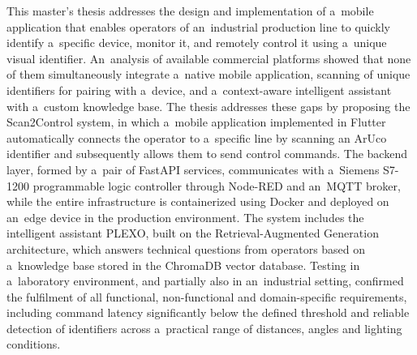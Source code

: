 This master's thesis addresses the design and implementation of a~mobile
application that enables operators of an~industrial production line to
quickly identify a~specific device, monitor it, and remotely control it
using a~unique visual identifier. An~analysis of available commercial
platforms showed that none of them simultaneously integrate a~native
mobile application, scanning of unique identifiers for pairing with
a~device, and a~context-aware intelligent assistant with a~custom
knowledge base. The thesis addresses these gaps by proposing the
Scan2Control system, in which a~mobile application implemented in Flutter
automatically connects the operator to a~specific line by scanning an
ArUco identifier and subsequently allows them to send control commands.
The backend layer, formed by a~pair of FastAPI
services, communicates with a~Siemens S7-1200 programmable logic
controller through Node-RED and an~MQTT broker, while the entire
infrastructure is containerized using Docker and deployed on an~edge
device in the production environment. The system includes the
intelligent assistant PLEXO, built on the Retrieval-Augmented Generation
architecture, which answers technical questions from operators based on
a~knowledge base stored in the ChromaDB vector database. Testing in
a~laboratory environment, and partially also in an~industrial setting,
confirmed the fulfilment of all functional, non-functional and
domain-specific requirements, including command latency significantly
below the defined threshold and reliable detection of identifiers across
a~practical range of distances, angles and lighting conditions.